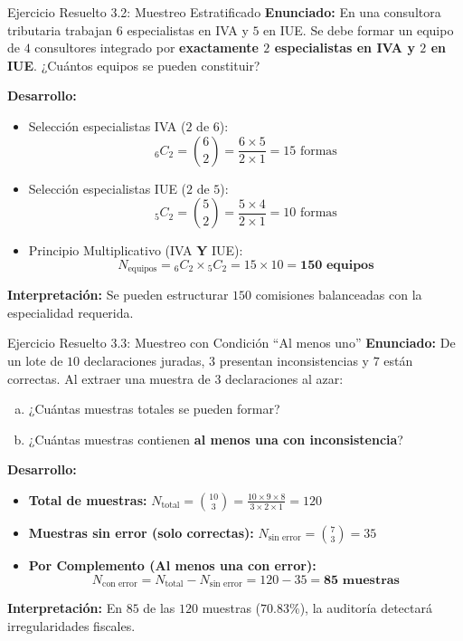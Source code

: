 \documentclass[10pt]{beamer}
\begin{document}
\begin{frame}{Ejercicio Resuelto 3.2: Muestreo Estratificado}
  \textbf{Enunciado:} En una consultora tributaria trabajan $6$ especialistas en IVA y $5$ en IUE. Se debe formar un equipo de $4$ consultores integrado por \textbf{exactamente $2$ especialistas en IVA y $2$ en IUE}. ¿Cuántos equipos se pueden constituir?

  \vspace{0.1cm}
  \textbf{Desarrollo:}
  \begin{itemize}
    \item Selección especialistas IVA ($2$ de $6$):
    $${_6 C_2} = \binom{6}{2} = \frac{6 \times 5}{2 \times 1} = 15 \text{ formas}$$
    \item Selección especialistas IUE ($2$ de $5$):
    $${_5 C_2} = \binom{5}{2} = \frac{5 \times 4}{2 \times 1} = 10 \text{ formas}$$
    \item Principio Multiplicativo (IVA \textbf{Y} IUE):
    $$N_{\text{equipos}} = {_6 C_2} \times {_5 C_2} = 15 \times 10 = \mathbf{150 \text{ equipos}}$$
  \end{itemize}

  \textbf{Interpretación:} Se pueden estructurar $150$ comisiones balanceadas con la especialidad requerida.
\end{frame}

\begin{frame}{Ejercicio Resuelto 3.3: Muestreo con Condición ``Al menos uno''}
  \textbf{Enunciado:} De un lote de $10$ declaraciones juradas, $3$ presentan inconsistencias y $7$ están correctas. Al extraer una muestra de $3$ declaraciones al azar:
  \begin{enumerate}[a)]
    \item ¿Cuántas muestras totales se pueden formar?
    \item ¿Cuántas muestras contienen \textbf{al menos una con inconsistencia}?
  \end{enumerate}

  \vspace{0.05cm}
  \textbf{Desarrollo:}
  \begin{itemize}
    \item \textbf{Total de muestras:} $N_{\text{total}} = \binom{10}{3} = \frac{10 \times 9 \times 8}{3 \times 2 \times 1} = 120$
    \item \textbf{Muestras sin error (solo correctas):} $N_{\text{sin error}} = \binom{7}{3} = 35$
    \item \textbf{Por Complemento (Al menos una con error):}
    $$N_{\text{con error}} = N_{\text{total}} - N_{\text{sin error}} = 120 - 35 = \mathbf{85 \text{ muestras}}$$
  \end{itemize}

  \textbf{Interpretación:} En $85$ de las $120$ muestras ($70.83\%$), la auditoría detectará irregularidades fiscales.
\end{frame}
\end{document}
